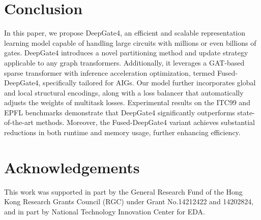 \vspace{-5pt}
\section{Conclusion}
\vspace{-5pt}
In this paper, we propose DeepGate4, an efficient and scalable representation learning model capable of handling large circuits with millions or even billions of gates. DeepGate4 introduces a novel partitioning method and update strategy applicable to any graph transformers. Additionally, it leverages a GAT-based sparse transformer with inference acceleration optimization, termed Fused-DeepGate4, specifically tailored for AIGs. Our model further incorporates global and local structural encodings, along with a loss balancer that automatically adjusts the weights of multitask losses.
Experimental results on the ITC99 and EPFL benchmarks demonstrate that DeepGate4 significantly outperforms state-of-the-art methods. Moreover, the Fused-DeepGate4 variant achieves substantial reductions in both runtime and memory usage, further enhancing efficiency.

\section*{Acknowledgements}
This work was supported in part by the General Research Fund of the Hong Kong Research Grants Council (RGC) under Grant No.14212422 and 14202824, and in part by National Technology Innovation Center for EDA.